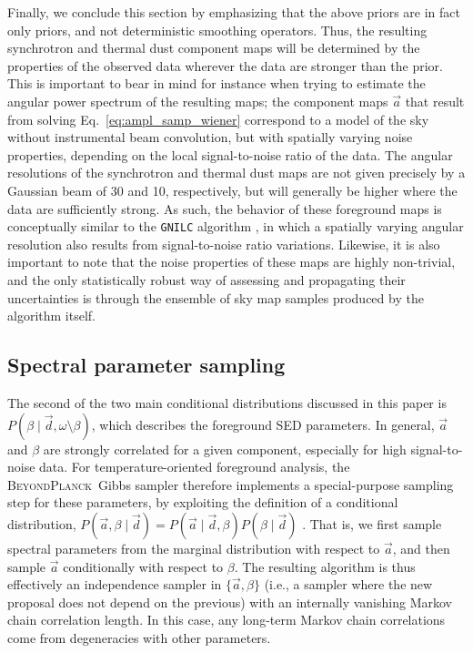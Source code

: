 \documentclass[twocolumn]{aa}
\renewcommand{\d}[0]{\vec{d}}
\renewcommand{\a}[0]{\vec{a}}
\newcommand{\BP}{\textsc{BeyondPlanck}}
\newcommand{\?}[1]{\textcolor{red}{{\bf [#1]}}}
\begin{document}
Finally, we conclude this section by emphasizing that the above priors are in
fact only priors, and not deterministic smoothing operators. Thus, the resulting
synchrotron and thermal dust component maps will be determined by the properties
of the observed data wherever the data are stronger than the prior.
This is important to bear in
mind for instance when trying to estimate the angular power spectrum of the
resulting maps; the component maps $\a$ that result from solving
Eq.~\eqref{eq:ampl_samp_wiener} correspond to a model of the sky without
instrumental beam convolution, but with spatially varying noise properties,
depending on the local signal-to-noise ratio of the data. The angular
resolutions of the synchrotron and thermal dust maps are not given
precisely by a Gaussian beam of 30 and 10\arcm, respectively, but will generally
be higher where the data are sufficiently strong. As such, the behavior of these
foreground maps is conceptually similar to the \texttt{GNILC} algorithm
\citep{Remazeilles2011b}, in which a spatially varying angular resolution also
results from signal-to-noise ratio variations. Likewise, it is also important to
note that the noise properties of these maps are highly non-trivial, and the
only statistically robust way of assessing and propagating their uncertainties
is through the ensemble of sky map samples produced by the algorithm itself.


\subsection{Spectral parameter sampling}

The second of the two main conditional distributions discussed in this paper is
$P(\beta\mid\d, \omega\setminus\beta)$, which describes the foreground SED
parameters. In general, $\a$ and $\beta$ are strongly correlated for a given
component, especially for high signal-to-noise data. For temperature-oriented
foreground analysis, the \BP\ Gibbs sampler therefore implements a
special-purpose sampling step for these parameters, by exploiting the definition
of a conditional distribution, $P(\a,\beta\mid\d) =
P(\a\mid\d,\beta)P(\beta\mid\d)$ \citep{stivoli:2010,bp01,bp13}. That is, we
first sample spectral parameters from the marginal distribution with respect to
$\a$, and then sample $\a$ conditionally with respect to $\beta$. The resulting
algorithm is thus effectively an independence sampler in $\{\a,\beta\}$ (i.e., a
sampler where the new proposal does not depend on the previous) with an internally
vanishing Markov chain correlation length. In this case, any long-term Markov
chain correlations come from degeneracies with other parameters.
\end{document}
